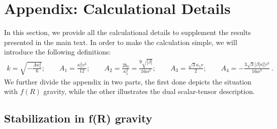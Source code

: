 \documentclass{article}
\begin{document}
\section{Appendix: Calculational Details}\label{App_01}

In this section, we provide all the calculational details to supplement the results presented in the main text. In order to make the calculation simple, we will introduce the following definitions:
\begin{align}
k=\sqrt{-\frac{\Lambda \kappa _{5}^{2}}{6}};\qquad A_{1}=\frac{\kappa _{5}^{2}v^{2}}{12};\qquad A_{2}=\frac{2b_{0}}{\kappa _{5}^{2}}=\frac{9\sqrt{|\beta|}}{16\alpha ^{2}};\qquad A_{3}=\frac{\sqrt{3}\kappa _{5}v}{2};\qquad A_{4}=-\frac{3\sqrt{3}|\beta|\kappa _{5}^{3}v^{3}}{16\alpha ^{3}}~.
\end{align}
We further divide the appendix in two parts, the first done depicts the situation with $f(R)$ gravity, while the other illustrates the dual scalar-tensor description.
\subsection{Stabilization in f(R) gravity}
\end{document}
